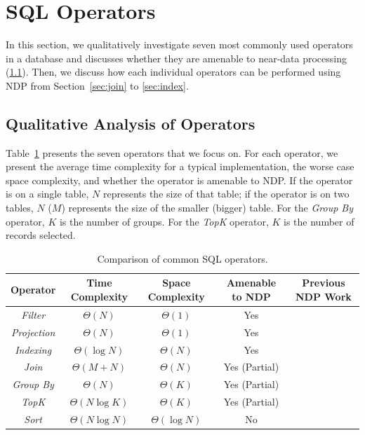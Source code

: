 \documentclass{article}
\newcommand{\filter}{\textit{Filter}\xspace}
\newcommand{\projection}{\textit{Projection}\xspace}
\newcommand{\join}{\textit{Join}\xspace}
\newcommand{\sort}{\textit{Sort}\xspace}
\newcommand{\indexing}{\textit{Indexing}\xspace}
\newcommand{\groupby}{\textit{Group By}\xspace}
\newcommand{\topk}{\textit{TopK}\xspace}
\begin{document}
\section{SQL Operators}

In this section, we qualitatively investigate seven most commonly used operators in a database and discusses whether they are amenable to near-data processing (\cref{sec:analysis}). Then, we discuss how each individual operators can be performed using NDP from Section~\ref{sec:join} to \ref{sec:index}.

\subsection{Qualitative Analysis of Operators} \label{sec:analysis}

Table~\ref{tab:operators} presents the seven operators that we focus on. For each operator, we present the average time complexity for a typical implementation, the worse case space complexity, and whether the operator is amenable to NDP.
If the operator is on a single table, $N$ represents the size of that table; if the operator is on two tables, $N$ ($M$) represents the size of the smaller (bigger) table. 
For the \groupby operator, $K$ is the number of groups. For the \topk operator, $K$ is the number of records selected. 

\begin{table}
\centering 
\begin{tabular}{ |c|c|c|c|c| } 
 \hline
 Operator       & Time Complexity & Space Complexity  & Amenable to NDP & Previous NDP Work \\ \hline
 \filter        & $\Theta(N)$     & $\Theta(1)$       & Yes             & \cite{netezza,exadata,biscuit,sukhwani2012database,do2013query} \\ \hline
 \projection    & $\Theta(N)$     & $\Theta(1)$       & Yes             & \cite{netezza, exadata} \\\hline
 \indexing      & $\Theta(\log{N})$ & $\Theta(N)$     & Yes             & \\ \hline
 \join          & $\Theta(M + N)$ & $\Theta(N)$       & Yes (Partial)   & \cite{exadata} \\ \hline
 \groupby       & $\Theta(N)$     & $\Theta(K)$       & Yes (Partial)   & \cite{ibex, jafar} \\ \hline
 \topk          & $\Theta(N\log{K})$ & $\Theta(K)$    & Yes (Partial)   & \\ \hline
 \sort          & $\Theta(N\log{N})$ & $\Theta(\log{N})$ & No           & \\ \hline
\end{tabular}
\caption{Comparison of common SQL operators.}
\label{tab:operators}
\end{table}
\end{document}
